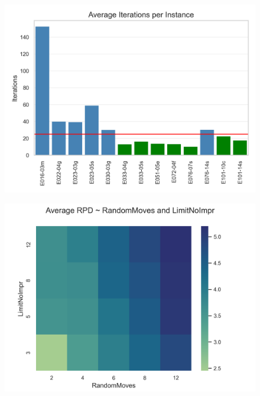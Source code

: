 \begin{figure}[ht]
	\centering
	\begin{minipage}[t]{0.49\textwidth}
		\centering
		\includegraphics[width=\linewidth]{pictures/iterations_per_instance.png}
		\label{fig:average_iterations_noclassifier}
	\end{minipage}\hfill
	\begin{minipage}[t]{0.49\textwidth}
		\centering
		\includegraphics[width=\linewidth]{pictures/heatmap_randomMoves_limitNoImpr.png}
		\label{fig:heatmap_parameter_study}
	\end{minipage}
\end{figure}

